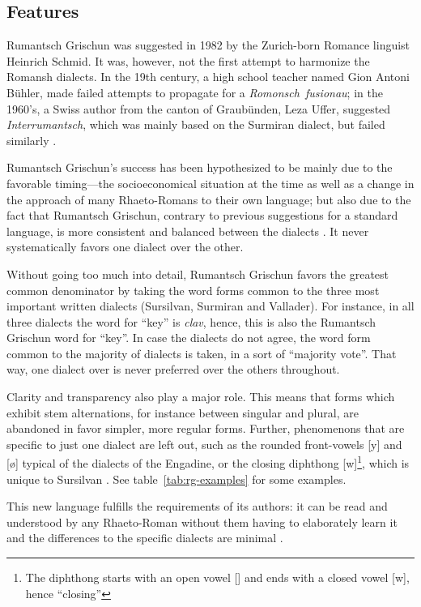 \subsection{Features}
Rumantsch Grischun was suggested in 1982 by the Zurich-born Romance linguist Heinrich Schmid. 
It was, however, not the first attempt to harmonize the Romansh dialects. 
In the 19th century, a high school teacher named Gion Antoni Bühler, made failed attempts to propagate for a \mbox{\emph{Romonsch fusionau}}; 
in the 1960's, a Swiss author from the canton of Graubünden, Leza Uffer, suggested \emph{Interrumantsch}, which was mainly based on the Surmiran dialect, but failed similarly \autocite[39]{liver1999}.

Rumantsch Grischun's success has been hypothesized to be mainly due to the favorable timing---the socioeconomical situation at the time as well as a change in the approach of many Rhaeto-Romans to their own language; but also due to the fact that Rumantsch Grischun, contrary to previous suggestions for a standard language, is more consistent and balanced between the dialects \autocite[69]{liver1999}. 
It never systematically favors one dialect over the other.

Without going too much into detail, Rumantsch Grischun favors the greatest common denominator by  taking the word forms common to the three most important written dialects (Sursilvan, Surmiran and Vallader). For instance, in all three dialects the word for \enquote{key} is \emph{clav}, hence, this is also the Rumantsch Grischun word for \enquote{key}.
In case the dialects do not agree, the word form common to the majority of dialects is taken, in a sort of \enquote{majority vote}. 
That way, one dialect over is never preferred over the others throughout. 

Clarity and transparency also play a major role. 
This means that forms which exhibit stem alternations, for instance between singular and plural, are abandoned in favor simpler, more regular forms.
Further, phenomenons that are specific to just one dialect are left out, such as the rounded front-vowels [y] and [ø] typical of the dialects of the Engadine, or the closing diphthong [\textsci w]\footnote{The diphthong starts with an open vowel [\textsci] and ends with a closed vowel [w], hence \enquote{closing}}, which is unique to Sursilvan \autocite[70]{liver1999}. 
See table~\ref{tab:rg-examples} for some examples.

This new language fulfills the requirements of its authors: it can be read and understood by any Rhaeto-Roman without them having to elaborately learn it and the differences to the specific dialects are minimal \autocite[72]{liver1999}. 


